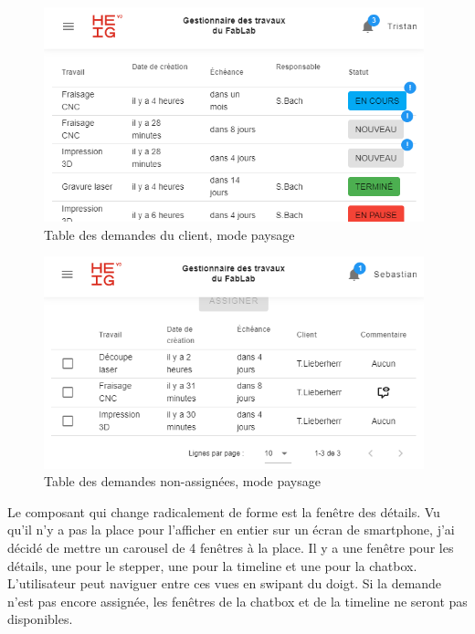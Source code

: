 \documentclass[
    iai, %
    eai, %
]{heig-tb}
\begin{document}
\begin{figure}[h]
  \centering
  \includegraphics[width=11cm]{ui_mobile_myjobs_client_landscape.PNG}
  \caption{Table des demandes du client, mode paysage}
\end{figure}

\begin{figure}[h]
  \centering
  \includegraphics[width=11cm]{ui_mobile_alljobs_landscape.PNG}
  \caption{Table des demandes non-assignées, mode paysage}
\end{figure}

Le composant qui change radicalement de forme est la fenêtre des détails. Vu qu'il n'y a pas la place pour l'afficher en entier sur un écran de smartphone, j'ai décidé de mettre un carousel de 4 fenêtres à la place. Il y a une fenêtre pour les détails, une pour le stepper, une pour la timeline et une pour la chatbox. L'utilisateur peut naviguer entre ces vues en swipant du doigt.
Si la demande n'est pas encore assignée, les fenêtres de la chatbox et de la timeline ne seront pas disponibles.

\newpage
\end{document}
